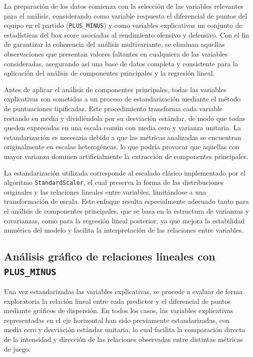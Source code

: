 \documentclass[12pt]{article}
\begin{document}
La preparación de los datos comienza con la selección de las variables relevantes para el análisis, considerando como variable respuesta el diferencial de puntos del equipo en el partido (\texttt{PLUS\_MINUS}) y como variables explicativas un conjunto de estadísticas del box score asociadas al rendimiento ofensivo y defensivo. Con el fin de garantizar la coherencia del análisis multivariante, se eliminan aquellas observaciones que presentan valores faltantes en cualquiera de las variables consideradas, asegurando así una base de datos completa y consistente para la aplicación del análisis de componentes principales y la regresión lineal.

Antes de aplicar el análisis de componentes principales, todas las variables explicativas son sometidas a un proceso de estandarización mediante el método de puntuaciones tipificadas. Este procedimiento transforma cada variable restando su media y dividiéndola por su desviación estándar, de modo que todas queden expresadas en una escala común con media cero y varianza unitaria. La estandarización es necesaria debido a que las métricas analizadas se encuentran originalmente en escalas heterogéneas, lo que podría provocar que aquellas con mayor varianza dominen artificialmente la extracción de componentes principales.

La estandarización utilizada corresponde al escalado clásico implementado por el algoritmo \texttt{StandardScaler}, el cual preserva la forma de las distribuciones originales y las relaciones lineales entre variables, limitándose a una transformación de escala. Este enfoque resulta especialmente adecuado tanto para el análisis de componentes principales, que se basa en la estructura de varianzas y covarianzas, como para la regresión lineal posterior, ya que mejora la estabilidad numérica del modelo y facilita la interpretación de las relaciones entre variables.

\subsection{Análisis gráfico de relaciones lineales con \texttt{PLUS\_MINUS}}

Una vez estandarizadas las variables explicativas, se procede a evaluar de forma exploratoria la relación lineal entre cada predictor y el diferencial de puntos mediante gráficos de dispersión. En todos los casos, las variables explicativas representadas en el eje horizontal han sido previamente estandarizadas, con media cero y desviación estándar unitaria, lo cual facilita la comparación directa de la intensidad y dirección de las relaciones observadas entre distintas métricas de juego.
\end{document}
